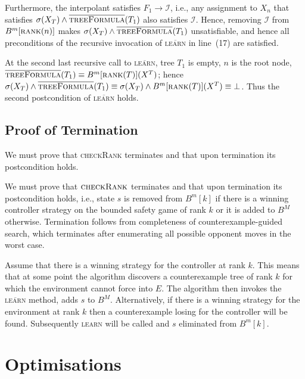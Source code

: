 \documentclass{llncs}
\newcommand{\II}{\mathcal{I}}
\newcommand{\textoverline}[1]{$\overline{\mbox{#1}}$}
\begin{document}
Furthermore, the interpolant satisfies $F_1 \rightarrow \II$, i.e., any
assignment to $X_n$ that satisfies $\sigma(X_T) \land
\textsc{\textoverline{treeFormula}}(T_1)$ also satisfies $\II$.  Hence,
removing $\II$ from $B^m[\textsc{rank}(n)]$ makes $\sigma(X_T) \land
\textsc{\textoverline{treeFormula}}(T_1)$ unsatisfiable, and hence all
preconditions of the recursive invocation of \textsc{\textoverline{learn}} in
line~(17) are satisfied.  

At the second last recursive call to \textsc{\textoverline{learn}}, tree $T_1$
is empty, $n$ is the root node, $\textsc{\textoverline{treeFormula}}(T_1)
\equiv B^m[\textsc{rank}(T)](X^T)$; hence $\sigma(X_T) \land
\textsc{\textoverline{treeFormula}}(T_1) \equiv \sigma(X_T) \land
B^m[\textsc{rank}(T)](X^T) \equiv \bot$.  Thus the second postcondition of
\textsc{\textoverline{learn}} holds.

\subsection{Proof of Termination}

We must prove that \textsc{checkRank} terminates and that upon termination its
postcondition holds.

We must prove that $\textsc{checkRank}$ terminates and that upon termination
its postcondition holds, i.e., state $s$ is removed from $B^m[k]$ if there is a
winning controller strategy on the bounded safety game of rank $k$ or it is
added to $B^M$ otherwise. Termination follows from completeness of
counterexample-guided search, which terminates after enumerating all possible
opponent moves in the worst case.

Assume that there is a winning strategy for the controller at rank $k$. This
means that at some point the algorithm discovers a counterexample tree of rank
$k$ for which the environment cannot force into $E$. The algorithm then invokes
the \textsc{\textoverline{learn}} method, adds $s$ to $B^M$.  Alternatively, if
there is a winning strategy for the environment at rank $k$ then a
counterexample losing for the controller will be found. Subsequently
\textsc{learn} will be called and $s$ eliminated from $B^m[k]$.

\section{Optimisations}

\end{document}
